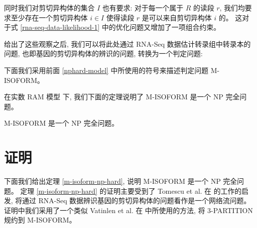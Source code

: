 
同时我们对剪切异构体的集合 $I$ 也有要求: 对于每一个属于 $R$ 的读段 $r$, 
我们均要求至少存在一个剪切异构体 $i \in I$ 使得读段 $r$ 是可以来自剪切异构体 $i$ 的。 
这对于式 \ref{rna-seq-data-likelihood-1} 中的优化问题又增加了一项组合约束。 

给出了这些观察之后, 我们可以将此处通过 RNA-Seq 数据估计转录组中转录本的问题, 
也即基因的剪切异构体的辨识的问题, 转换为一个判定问题:
\begin{center}
\end{center}

下面我们采用前面 \ref{nphard-model} 中所使用的符号来描述判定问题 M-ISOFORM。 

\newtheorem*{misof}{M-ISOFORM}

\begin{center}
\end{center}

在实数 RAM 模型 \cite{Preparata:1985:CGI:4333} 下, 
我们下面的定理说明了 M-ISOFORM 是一个 NP 完全问题。 

\begin{thm}
\label{m-isoform-np-hard}
M-ISOFORM 是一个 NP 完全问题。
\end{thm}

\section{证明}

下面我们给出定理 \ref{m-isoform-np-hard}, 说明 M-ISOFORM 是一个 NP 完全问题。 
定理 \ref{m-isoform-np-hard} 的证明主要受到了 
Tomescu et al. 在  的工作的启发, 
将通过 RNA-Seq 数据辨识基因的剪切异构体的问题看作是一个网络流问题。 
证明中我们采用了一个类似 Vatinlen et al. 在  中所使用的方法, 
将 3-PARTITION \cite{doi:10.1137/0204035, Garey:1990:CIG:574848} 规约到 M-ISOFORM。 

